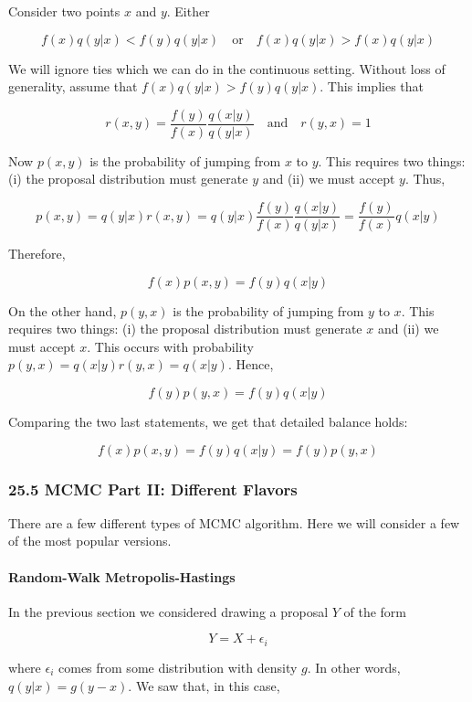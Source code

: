 Consider two points \(x\) and \(y\). Either

\[
f(x) q(y | x) < f(y) q(y | x)
\quad \text{or} \quad
f(x) q(y | x) > f(x) q(y | x)
\]

We will ignore ties which we can do in the continuous setting. Without
loss of generality, assume that \(f(x) q(y | x) > f(y) q(y | x)\). This
implies that

\[ r(x, y) = \frac{f(y)}{f(x)} \frac{q(x | y)}{q(y | x)} 
\quad \text{and} \quad
r(y, x) = 1
\]

Now \(p(x, y)\) is the probability of jumping from \(x\) to \(y\). This
requires two things: (i) the proposal distribution must generate \(y\)
and (ii) we must accept \(y\). Thus,

\[ p(x, y) = q(y | x) r(x, y) =  q(y | x) \frac{f(y)}{f(x)} \frac{q(x | y)}{q(y | x)} = \frac{f(y)}{f(x)} q(x | y)\]

Therefore,

\[ f(x) p(x, y) = f(y) q(x | y) \]

On the other hand, \(p(y, x)\) is the probability of jumping from \(y\)
to \(x\). This requires two things: (i) the proposal distribution must
generate \(x\) and (ii) we must accept \(x\). This occurs with
probability \(p(y, x) = q(x | y) r(y, x) = q(x | y)\). Hence,

\[ f(y) p(y, x) = f(y) q(x | y) \]

Comparing the two last statements, we get that detailed balance holds:

\[ f(x) p(x, y) = f(y) q(x | y) = f(y) p(y, x) \]

\subsubsection{25.5 MCMC Part II: Different Flavors}\label{mcmc-part-ii-different-flavors}

There are a few different types of MCMC algorithm. Here we will consider
a few of the most popular versions.

\paragraph{Random-Walk Metropolis-Hastings}\label{random-walk-metropolis-hastings}

In the previous section we considered drawing a proposal \(Y\) of the
form

\[ Y = X + \epsilon_i \]

where \(\epsilon_i\) comes from some distribution with density \(g\). In
other words, \(q(y | x) = g(y - x)\). We saw that, in this case,

